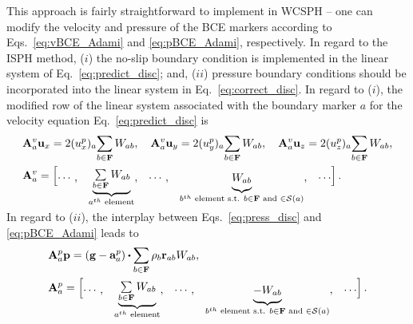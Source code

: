 This approach is fairly straightforward to implement in WCSPH -- one can modify the velocity and  pressure of the BCE markers according to Eqs.~\ref{eq:vBCE_Adami} and \ref{eq:pBCE_Adami}, respectively. In regard to the ISPH method, ($i$) the no-slip boundary condition is implemented in the linear system of Eq.~\ref{eq:predict_disc}; and, ($ii$) pressure boundary conditions should be incorporated into the linear system in Eq.~\ref{eq:correct_disc}. In regard to ($i$), the modified row of the linear system associated with the boundary marker $a$ for the velocity equation Eq.~\ref{eq:predict_disc} is
\begin{align}\renewcommand{\arraystretch}{1.2}
&\mathbf{A}^{v}_a \mathbf{u}_x=  2 ({u}_x^{p})_a {\sum\limits_{b \in \mathbf{F}} {W_{ab}}},
\quad
\mathbf{A}^{v}_a \mathbf{u}_y=  2 ({u}_y^{p})_a {\sum\limits_{b \in \mathbf{F}} {W_{ab}}}, 
\quad
\mathbf{A}^{v}_a \mathbf{u}_z=  2 ({u}_z^{p})_a {\sum\limits_{b \in \mathbf{F}} {W_{ab}}},  \\
&\mathbf{A}^{v}_a= \begin{bmatrix}
\cdots, & 
\smash[b]{\underbrace{\begin{matrix}{\sum\limits_{b \in \mathbf{F}} {W_{ab}}} \end{matrix}}_{a^{th}\text{ element}}} ,
&\cdots, &\smash[b]{\underbrace{\begin{matrix} {W_{ab}}\end{matrix}}_{b^{th}\text{ element s.t. }{b \in \mathbf{F} \text{ and } \in \support{a}} }}, & \cdots
\end{bmatrix} \label{eq:U_BC}.
\end{align}
\\
In regard to ($ii$), the interplay between Eqs.~\ref{eq:press_disc} and \ref{eq:pBCE_Adami} leads to
\begin{align}\renewcommand{\arraystretch}{1.2}
&\mathbf{A}^{p}_a \mathbf{p}= \left( \mathbf{g} - \mathbf{a}_a^p \right) \bigcdot \sum\limits_{b \in \bf F} {\rho_b \mathbf{r}_{ab} W_{ab} },\\
&\mathbf{A}^{p}_a= \begin{bmatrix}
\cdots, & 
\smash[b]{\underbrace{\begin{matrix}{\sum\limits_{b \in \mathbf{F}} {W_{ab}}} \end{matrix}}_{a^{th}\text{ element}}} ,
&\cdots, &\smash[b]{\underbrace{\begin{matrix} {-W_{ab}}\end{matrix}}_{b^{th}\text{ element s.t. }{b \in \mathbf{F} \text{ and } \in \support{a}} }}, & \cdots
\end{bmatrix} \label{eq:p_BC}.
\end{align}
\\

